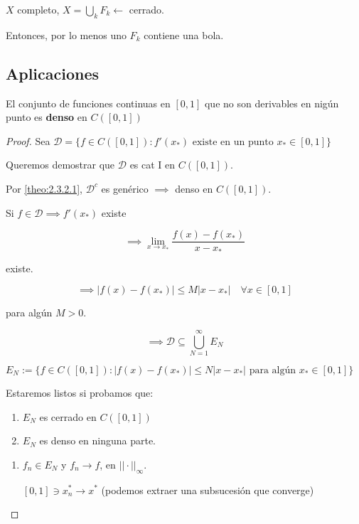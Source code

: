 \begin{fcorollary}
    $X$ completo, $X=\bigcup_k F_k\leftarrow$ cerrado.

    Entonces, por lo menos uno $F_k$ contiene una bola.
\end{fcorollary}

\subsection{Aplicaciones}

\begin{ftheorem}
    El conjunto de funciones continuas en $[0,1]$ que no son derivables en nigún punto es \textbf{denso} en $C([0,1])$
\end{ftheorem}

\begin{proof}
    Sea $\mathcal{D}=\{f\in C([0,1]):f'(x_*) \text{ existe en un punto } x_*\in [0,1]\}$

    Queremos demostrar que $\mathcal{D}$ es cat I en $C([0,1])$.

    Por \ref{theo:2.3.2.1}, $\mathcal{D}^c$ es genérico $\implies$ denso en $C([0,1])$.

    Si $f\in \mathcal{D}\implies f'(x_*)$ existe

    \[\implies \lim_{x\to x_*} \frac{f(x)-f(x_*)}{x-x_*}\]

    existe.

    \[\implies |f(x)-f(x_*)|\leq M|x-x_*|\quad \forall x\in [0,1]\]

    para algún $M>0$.

    \[\implies \mathcal{D}\subseteq \bigcup_{N=1}^\infty E_N\]

    $E_N:=\{f\in C([0,1]):|f(x)-f(x_*)|\leq N|x-x_*|\text{ para algún $x_*\in[0,1]$}\}$

    Estaremos listos si probamos que:

    \begin{enumerate}
        \item $E_N$ es cerrado en $C([0,1])$
        \item $E_N$ es denso en ninguna parte.
    \end{enumerate}

    \begin{enumerate}
        \item $f_n\in E_N$ y $f_n\to f$, en $||\cdot||_\infty$.
        
        $[0,1]\ni x_n^*\to x^*$ (podemos extraer una subsucesión que converge)


\end{enumerate}
\end{proof}
